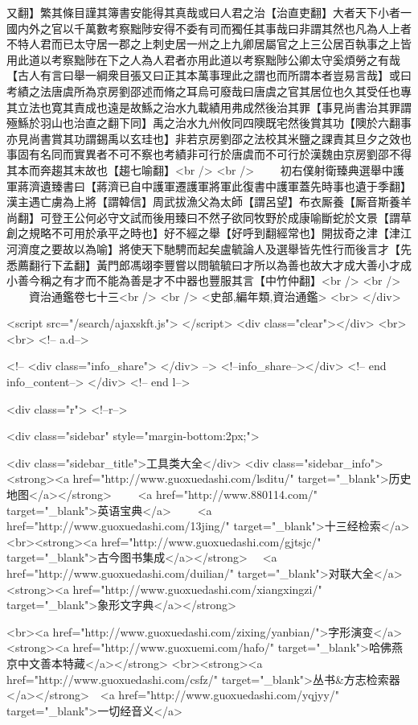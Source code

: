 又翻】繁其條目謹其簿書安能得其真哉或曰人君之治【治直吏翻】大者天下小者一國内外之官以千萬數考察黜陟安得不委有司而獨任其事哉曰非謂其然也凡為人上者不特人君而已太守居一郡之上刺史居一州之上九卿居屬官之上三公居百執事之上皆用此道以考察黜陟在下之人為人君者亦用此道以考察黜陟公卿太守奚煩勞之有哉【古人有言曰舉一綱衆目張又曰正其本萬事理此之謂也而所謂本者豈易言哉】或曰考績之法唐虞所為京房劉邵述而脩之耳烏可廢哉曰唐虞之官其居位也久其受任也專其立法也寛其責成也遠是故鯀之治水九載績用弗成然後治其罪【事見尚書治其罪謂殛鯀於羽山也治直之翻下同】禹之治水九州攸同四隩既宅然後賞其功【隩於六翻事亦見尚書賞其功謂錫禹以玄珪也】非若京房劉邵之法校其米鹽之課責其旦夕之效也事固有名同而實異者不可不察也考績非可行於唐虞而不可行於漢魏由京房劉邵不得其本而奔趨其末故也【趨七喻翻】<br />
<br />
　　初右僕射衛臻典選舉中護軍蔣濟遺臻書曰【蔣濟已自中護軍遷護軍將軍此復書中護軍蓋先時事也遺于季翻】漢主遇亡虜為上將【謂韓信】周武拔漁父為太師【謂呂望】布衣厮養【厮音斯養羊尚翻】可登王公何必守文試而後用臻曰不然子欲同牧野於成康喻斷蛇於文景【謂草創之規略不可用於承平之時也】好不經之舉【好呼到翻經常也】開拔奇之津【津江河濟度之要故以為喻】將使天下馳騁而起矣盧毓論人及選舉皆先性行而後言才【先悉薦翻行下孟翻】黃門郎馮翊李豐嘗以問毓毓曰才所以為善也故大才成大善小才成小善今稱之有才而不能為善是才不中器也豐服其言【中竹仲翻】<br />
<br />
　　資治通鑑卷七十三<br />
<br />
<史部,編年類,資治通鑑>  <br>
   </div> 

<script src="/search/ajaxskft.js"> </script>
 <div class="clear"></div>
<br>
<br>
 <!-- a.d-->

 <!--
<div class="info_share">
</div> 
-->
 <!--info_share--></div>   <!-- end info_content-->
  </div> <!-- end l-->

<div class="r">   <!--r-->



<div class="sidebar"  style="margin-bottom:2px;">

 
<div class="sidebar_title">工具类大全</div>
<div class="sidebar_info">
<strong><a href="http://www.guoxuedashi.com/lsditu/" target="_blank">历史地图</a></strong>　　
<a href="http://www.880114.com/" target="_blank">英语宝典</a>　　
<a href="http://www.guoxuedashi.com/13jing/" target="_blank">十三经检索</a>　
<br><strong><a href="http://www.guoxuedashi.com/gjtsjc/" target="_blank">古今图书集成</a></strong>　
<a href="http://www.guoxuedashi.com/duilian/" target="_blank">对联大全</a>　<strong><a href="http://www.guoxuedashi.com/xiangxingzi/" target="_blank">象形文字典</a></strong>　

<br><a href="http://www.guoxuedashi.com/zixing/yanbian/">字形演变</a>　　<strong><a href="http://www.guoxuemi.com/hafo/" target="_blank">哈佛燕京中文善本特藏</a></strong>
<br><strong><a href="http://www.guoxuedashi.com/csfz/" target="_blank">丛书&方志检索器</a></strong>　<a href="http://www.guoxuedashi.com/yqjyy/" target="_blank">一切经音义</a>　　

